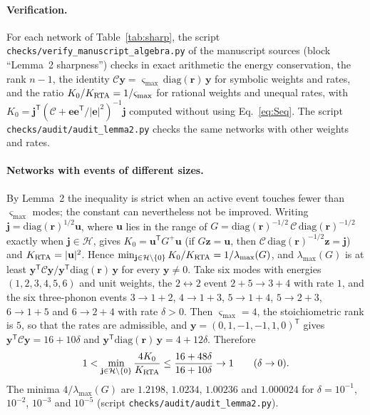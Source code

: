 \documentclass[aps,prb,10pt,onecolumn,amsmath,amssymb,superscriptaddress,nofootinbib]{revtex4-2}
\theoremstyle{plain}
\newcommand{\tr}{^{\mathsf T}}
\newcommand{\Cop}{\mathcal C}
\newcommand{\Hsp}{\mathcal H}
\newcommand{\ee}{\mathbf e}
\newcommand{\jj}{\mathbf j}
\newcommand{\yy}{\mathbf y}
\begin{document}
\paragraph*{Verification.}
For each network of Table~\ref{tab:sharp}, the script \texttt{checks/\allowbreak verify\_manuscript\_algebra.py} of the
manuscript sources (block ``Lemma~2 sharpness'') checks in exact arithmetic the energy conservation, the
rank $n-1$, the identity $\Cop\yy=\varsigma_{\max}\,\mathrm{diag}(\mathbf r)\,\yy$ for symbolic weights and
rates, and the ratio $K_0/K_{\rm RTA}=1/\varsigma_{\max}$ for rational weights and unequal rates, with
$K_0=\jj\tr(\Cop+\ee\ee\tr/|\ee|^2)^{-1}\jj$ computed without using Eq.~\eqref{eq:Seq}. The script
\texttt{checks/\allowbreak audit/\allowbreak audit\_lemma2.py} checks the same networks with other weights and rates.

\paragraph*{Networks with events of different sizes.}
By Lemma~2 the inequality is strict when an active event touches fewer than $\varsigma_{\max}$ modes; the
constant can nevertheless not be improved. Writing $\jj=\mathrm{diag}(\mathbf r)^{1/2}\mathbf u$, where
$\mathbf u$ lies in the range of $G=\mathrm{diag}(\mathbf r)^{-1/2}\,\Cop\,\mathrm{diag}(\mathbf r)^{-1/2}$
exactly when $\jj\in\Hsp$, gives $K_0=\mathbf u\tr G^+\mathbf u$ (if $G\mathbf z=\mathbf u$, then $\Cop\,\mathrm{diag}(\mathbf r)^{-1/2}\mathbf z=\jj$) and $K_{\rm RTA}=|\mathbf u|^2$. Hence
$\min_{\jj\in\Hsp\setminus\{0\}}K_0/K_{\rm RTA}=1/\lambda_{\max}(G)$, and $\lambda_{\max}(G)$ is at least
$\yy\tr\Cop\yy/\yy\tr\mathrm{diag}(\mathbf r)\,\yy$ for every $\yy\ne0$. Take six modes with energies
$(1,2,3,4,5,6)$ and unit weights, the $2\leftrightarrow2$ event $2+5\to3+4$ with rate $1$, and the six
three-phonon events $3\to1+2$, $4\to1+3$, $5\to1+4$, $5\to2+3$, $6\to1+5$ and $6\to2+4$ with rate $\delta>0$.
Then $\varsigma_{\max}=4$, the stoichiometric rank is $5$, so that the rates are admissible, and
$\yy=(0,1,-1,-1,1,0)\tr$ gives $\yy\tr\Cop\yy=16+10\delta$ and $\yy\tr\mathrm{diag}(\mathbf r)\,\yy=4+12\delta$.
Therefore
\begin{equation}
1<\min_{\jj\in\Hsp\setminus\{0\}}\frac{4K_0}{K_{\rm RTA}}\le\frac{16+48\delta}{16+10\delta}\to1
\qquad(\delta\to0).
\label{eq:mixed}
\end{equation}
The minima $4/\lambda_{\max}(G)$ are $1.2198$, $1.0234$, $1.00236$ and $1.000024$ for $\delta=10^{-1}$,
$10^{-2}$, $10^{-3}$ and $10^{-5}$ (script \texttt{checks/\allowbreak audit/\allowbreak audit\_lemma2.py}).
\end{document}
